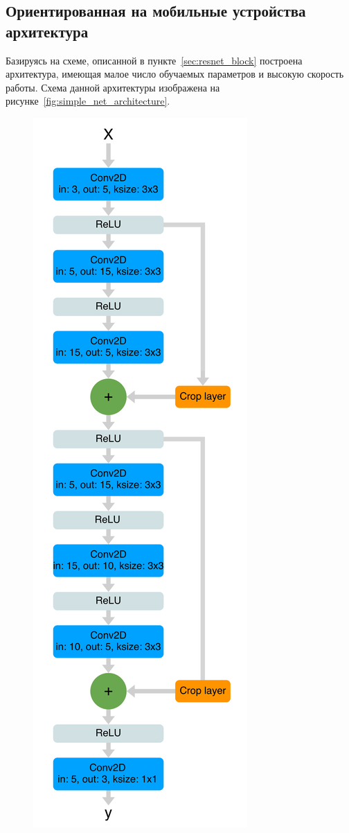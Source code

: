 \subsection{Ориентированная на мобильные устройства архитектура}

Базируясь на схеме, описанной в пункте~\ref{sec:resnet_block} построена архитектура, имеющая малое число обучаемых параметров и высокую скорость работы. Схема данной архитектуры изображена на рисунке~\ref{fig:simple_net_architecture}.

\begin{figure}[h!]
	\centering
	\includegraphics[width=\textwidth / 3]{img/simple_net_architecture}

\end{figure}
